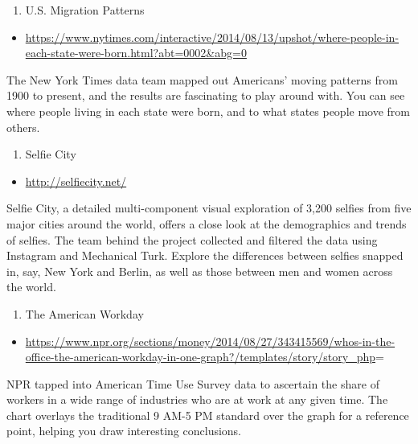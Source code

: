 \documentclass[]{book}
\providecommand{\tightlist}{%
  \setlength{\itemsep}{0pt}\setlength{\parskip}{0pt}}
\theoremstyle{definition}
\theoremstyle{definition}
\theoremstyle{definition}
\theoremstyle{remark}
\begin{document}
\begin{enumerate}
\def\labelenumi{\arabic{enumi}.}
\setcounter{enumi}{11}
\tightlist
\item
  U.S. Migration Patterns
\end{enumerate}

\begin{itemize}
\tightlist
\item
  \url{https://www.nytimes.com/interactive/2014/08/13/upshot/where-people-in-each-state-were-born.html?abt=0002\&abg=0}
\end{itemize}

The New York Times data team mapped out Americans' moving patterns from
1900 to present, and the results are fascinating to play around with.
You can see where people living in each state were born, and to what
states people move from others.

\begin{enumerate}
\def\labelenumi{\arabic{enumi}.}
\setcounter{enumi}{12}
\tightlist
\item
  Selfie City
\end{enumerate}

\begin{itemize}
\tightlist
\item
  \url{http://selfiecity.net/}
\end{itemize}

Selfie City, a detailed multi-component visual exploration of 3,200
selfies from five major cities around the world, offers a close look at
the demographics and trends of selfies. The team behind the project
collected and filtered the data using Instagram and Mechanical Turk.
Explore the differences between selfies snapped in, say, New York and
Berlin, as well as those between men and women across the world.

\begin{enumerate}
\def\labelenumi{\arabic{enumi}.}
\setcounter{enumi}{13}
\tightlist
\item
  The American Workday
\end{enumerate}

\begin{itemize}
\tightlist
\item
  \url{https://www.npr.org/sections/money/2014/08/27/343415569/whos-in-the-office-the-american-workday-in-one-graph?/templates/story/story_php}=
\end{itemize}

NPR tapped into American Time Use Survey data to ascertain the share of
workers in a wide range of industries who are at work at any given time.
The chart overlays the traditional 9 AM-5 PM standard over the graph for
a reference point, helping you draw interesting conclusions.
\end{document}
